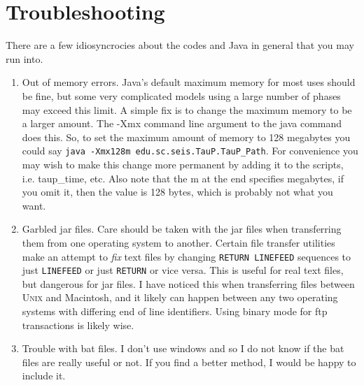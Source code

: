  
\section{Troubleshooting}

There are a few idiosyncrocies about the codes and Java in general that you may
run into.

\begin{enumerate}

\item Out of memory errors. Java's default maximum memory for most uses should be fine,
 but some very complicated
models using a large number of phases may exceed this limit. A simple fix is
to change the maximum memory to be a larger amount. The -Xmx command line argument
to the java command does this. So, to set the maximum amount of memory to
128 megabytes you could say \texttt{java -Xmx128m edu.sc.seis.TauP.TauP\_Path}.
For convenience you may wish to make this change more permanent by adding it
to the scripts, i.e. taup\_time, etc. Also note that the m at the end specifies megabytes, if you 
omit it, then the value is 128 bytes, which is probably not what you want.

\item Garbled jar files. Care should be taken with the jar files when 
transferring them
from one operating system to another. Certain file transfer utilities 
make an attempt
to \textit{fix} text files by changing \texttt{RETURN LINEFEED} sequences to
just \texttt{LINEFEED} or just \texttt{RETURN} or vice versa. This is useful for
real text files, but dangerous for jar files. I have noticed this when 
transferring
files between \textsc{Unix} and Macintosh, and it likely can happen 
between any two
operating systems with differing end of line identifiers. Using binary mode for
ftp transactions is likely wise.

\item Trouble with bat files. I don't use windows and so I do not know if the
bat files are really useful or not. If you find a better method, I would be 
happy to include it.
\end{enumerate}

